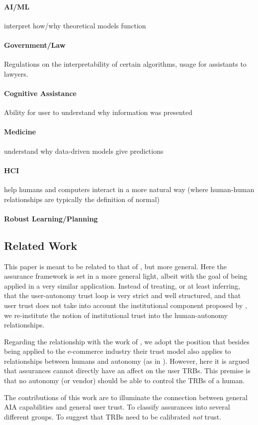     \paragraph{AI/ML} interpret how/why theoretical models function
    \paragraph{Government/Law} Regulations on the interpretability of certain algorithms, usage for assistants to lawyers.
    \paragraph{Cognitive Assistance} Ability for user to understand why information was presented
    \paragraph{Medicine} understand why data-driven models give predictions
    \paragraph{HCI} help humans and computers interact in a more natural way (where human-human relationships are typically the definition of normal)
    \paragraph{Robust Learning/Planning}

\subsection{Related Work}
    This paper is meant to be related to that of \citet{Lillard2016-yg}, but more general. Here the assurance framework is set in a more general light, albeit with the goal of being applied in a very similar application. Instead of treating, or at least inferring, that the user-autonomy trust loop is very strict and well structured, and that user trust does not take into account the institutional component proposed by \citet{McKnight2001-fa}, we re-institute the notion of institutional trust into the human-autonomy relationships.

    Regarding the relationship with the work of \citet{McKnight2001-fa}, we adopt the position that besides being applied to the e-commerce industry their trust model also applies to relationships between humans and autonomy (as in \citet{Lillard2016-yg}). However, here it is argued that assurances cannot directly have an affect on the user TRBs. This premise is that no autonomy (or vendor) should be able to control the TRBs of a human.

    The contributions of this work are to illuminate the connection between general AIA capabilities and general user trust. To classify assurances into several different groups. To suggest that TRBs need to be calibrated \emph{not} trust.







